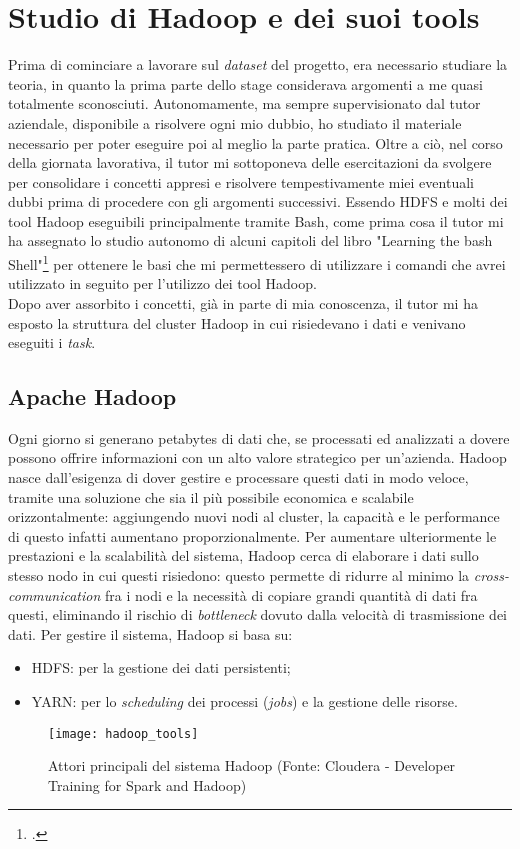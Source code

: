 
\section{Studio di Hadoop e dei suoi tools}
Prima di cominciare a lavorare sul \textit{dataset} del progetto, era necessario studiare la teoria, in quanto la prima parte dello stage considerava argomenti a me quasi totalmente sconosciuti.
Autonomamente, ma sempre supervisionato dal tutor aziendale, disponibile a risolvere ogni mio dubbio, ho studiato il materiale necessario per poter eseguire poi al meglio la parte pratica. Oltre a ciò, nel corso della giornata lavorativa, il tutor mi sottoponeva delle esercitazioni da svolgere per consolidare i concetti appresi e risolvere tempestivamente miei eventuali dubbi prima di procedere con gli argomenti successivi.
Essendo \gls{HDFS} e molti dei tool Hadoop eseguibili principalmente tramite \gls{Bash}, come prima cosa il tutor mi ha assegnato lo studio autonomo di alcuni capitoli del libro "Learning the bash Shell"\footcite{http://shop.oreilly.com/product/9780596009656.do} per ottenere le basi che mi permettessero di utilizzare i comandi che avrei utilizzato in seguito per l'utilizzo dei tool Hadoop.\\
Dopo aver assorbito i concetti, già in parte di mia conoscenza, il tutor mi ha esposto la struttura del \gls{cluster} Hadoop in cui risiedevano i dati e venivano eseguiti i \textit{task}. 

\subsection{Apache Hadoop}
Ogni giorno si generano petabytes di dati che, se processati ed analizzati a dovere possono offrire informazioni con un alto valore strategico per un'azienda. Hadoop nasce dall'esigenza di dover gestire e processare questi dati in modo veloce, tramite una soluzione che sia il più possibile economica e scalabile orizzontalmente: aggiungendo nuovi nodi al \gls{cluster}, la capacità e le performance di questo infatti aumentano proporzionalmente. Per aumentare ulteriormente le prestazioni e la scalabilità del sistema, Hadoop cerca di elaborare i dati sullo stesso nodo in cui questi risiedono: questo permette di ridurre al minimo la \textit{cross-communication} fra i nodi e la necessità di copiare grandi quantità di dati fra questi, eliminando il rischio di \textit{bottleneck} dovuto dalla velocità di trasmissione dei dati. Per gestire il sistema, Hadoop si basa su:
\begin{itemize}
	\item \gls{HDFS}: per la gestione dei dati persistenti;
	\item YARN: per lo \textit{scheduling} dei processi (\textit{jobs}) e la gestione delle risorse.
\end{itemize}
\begin{figure}[!h]
	\centering 
	\texttt{[image: hadoop\_tools]}
	\caption{Attori principali del sistema Hadoop (Fonte: Cloudera - Developer Training for Spark and Hadoop)}
\end{figure}
